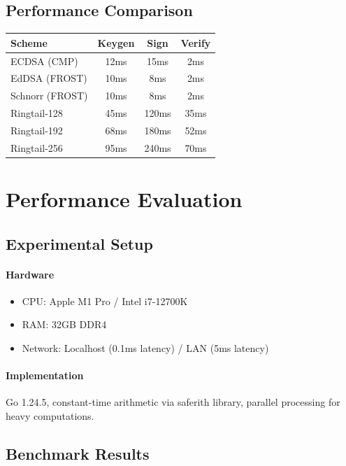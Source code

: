 \documentclass[11pt,twocolumn]{article}
\begin{document}
\subsection{Performance Comparison}

\begin{table}[h]
\centering
\small
\begin{tabular}{@{}lccc@{}}
\toprule
\textbf{Scheme} & \textbf{Keygen} & \textbf{Sign} & \textbf{Verify} \\
\midrule
ECDSA (CMP) & 12ms & 15ms & 2ms \\
EdDSA (FROST) & 10ms & 8ms & 2ms \\
Schnorr (FROST) & 10ms & 8ms & 2ms \\
Ringtail-128 & 45ms & 120ms & 35ms \\
Ringtail-192 & 68ms & 180ms & 52ms \\
Ringtail-256 & 95ms & 240ms & 70ms \\
\bottomrule
\end{tabular}

\label{tab:pq_performance}
\end{table}

\section{Performance Evaluation}

\subsection{Experimental Setup}

\paragraph{Hardware}
\begin{itemize}
\item CPU: Apple M1 Pro / Intel i7-12700K
\item RAM: 32GB DDR4
\item Network: Localhost (0.1ms latency) / LAN (5ms latency)
\end{itemize}

\paragraph{Implementation} Go 1.24.5, constant-time arithmetic via saferith library, parallel processing for heavy computations.

\subsection{Benchmark Results}
\end{document}
